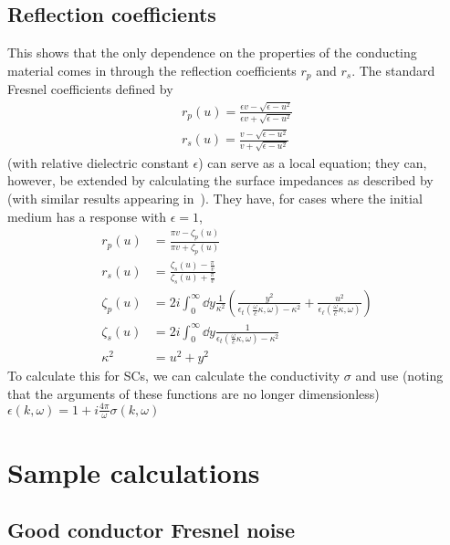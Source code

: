 \documentclass[11pt]{article}
\begin{document}
	\subsection{Reflection coefficients} \label{subsec:ReflectionCoeffs}
	This shows that the only dependence on the properties of the conducting material comes in through the reflection coefficients $r_p$ and $r_s$.
	The standard Fresnel coefficients defined by
	\begin{align}
		r_p(u) = \frac{\epsilon v - \sqrt{\epsilon - u^2}}{\epsilon v + \sqrt{\epsilon - u^2}} \\
		r_s(u) = \frac{v - \sqrt{\epsilon - u^2}}{v + \sqrt{\epsilon - u^2}}
	\end{align}
	(with relative dielectric constant $\epsilon$) can serve as a local equation;
	they can, however, be extended by calculating the surface impedances as described by~\cite{Ford1984} (with similar results appearing in~\cite{Nam1967_Part2}).
	They have, for cases where the initial medium has a response with $\epsilon = 1$,
	\begin{align}
		r_p(u) &= \frac{\pi v - \zeta_p(u)}{\pi v + \zeta_p(u)} \\
		r_s(u) &= \frac{\zeta_s(u) - \frac{\pi}{v}}{\zeta_s(u) + \frac{\pi}{v}} \\
		\zeta_p(u) &= 2i \int_0^\infty \dd{y} \frac{1}{\kappa^2} \left( \frac{y^2}{\epsilon_t(\frac{\omega}{c}\kappa, \omega) - \kappa^2} + \frac{u^2}{\epsilon_\ell(\frac{\omega}{c}\kappa, \omega)} \right) \\
		\zeta_s(u) &= 2i \int_0^\infty \dd{y} \frac{1}{\epsilon_t(\frac{\omega}{c}\kappa, \omega) - \kappa^2} \\
		\kappa^2 &= u^2 + y^2
	\end{align}
	To calculate this for SCs, we can calculate the conductivity $\sigma$ and use (noting that the arguments of these functions are no longer dimensionless) $\epsilon(k, \omega) = 1 + i \frac{4 \pi}{\omega} \sigma(k, \omega)$%

	\section{Sample calculations} \label{sec:SampleCalcs}

	\subsection{Good conductor Fresnel noise} \label{subsec:sample:fresnelperfect}
\end{document}

